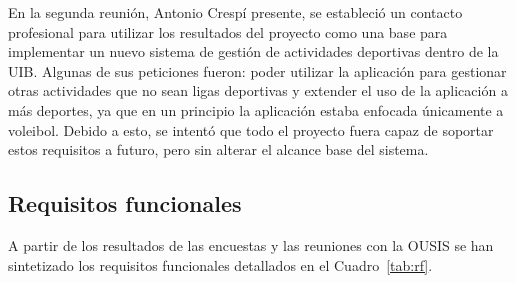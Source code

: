 En la segunda reunión, Antonio Crespí presente, se estableció un contacto profesional para utilizar los resultados del proyecto como una base para implementar un nuevo sistema de gestión de actividades deportivas dentro de la \ac{UIB}. Algunas de sus peticiones fueron: poder utilizar la aplicación para gestionar otras actividades que no sean ligas deportivas y extender el uso de la aplicación a más deportes, ya que en un principio la aplicación estaba enfocada únicamente a voleibol. Debido a esto, se intentó que todo el proyecto fuera capaz de soportar estos requisitos a futuro, pero sin alterar el alcance base del sistema.

\subsection{Requisitos funcionales}

A partir de los resultados de las encuestas y las reuniones con la \ac{OUSIS} se han sintetizado los requisitos funcionales detallados en el Cuadro~\ref{tab:rf}.

